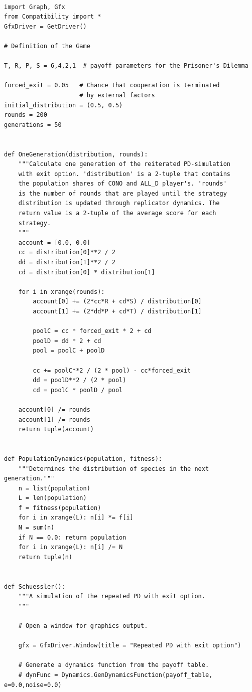 \begin{scriptsize}
\begin{verbatim}

import Graph, Gfx
from Compatibility import *
GfxDriver = GetDriver()

# Definition of the Game

T, R, P, S = 6,4,2,1  # payoff parameters for the Prisoner's Dilemma

forced_exit = 0.05   # Chance that cooperation is terminated 
                     # by external factors
initial_distribution = (0.5, 0.5)
rounds = 200
generations = 50


def OneGeneration(distribution, rounds):
    """Calculate one generation of the reiterated PD-simulation
    with exit option. 'distribution' is a 2-tuple that contains
    the population shares of CONO and ALL_D player's. 'rounds'
    is the number of rounds that are played until the strategy
    distribution is updated through replicator dynamics. The
    return value is a 2-tuple of the average score for each
    strategy.
    """
    account = [0.0, 0.0]
    cc = distribution[0]**2 / 2
    dd = distribution[1]**2 / 2
    cd = distribution[0] * distribution[1]
    
    for i in xrange(rounds):       
        account[0] += (2*cc*R + cd*S) / distribution[0]
        account[1] += (2*dd*P + cd*T) / distribution[1]

        poolC = cc * forced_exit * 2 + cd
        poolD = dd * 2 + cd
        pool = poolC + poolD
       
        cc += poolC**2 / (2 * pool) - cc*forced_exit
        dd = poolD**2 / (2 * pool)
        cd = poolC * poolD / pool
        
    account[0] /= rounds
    account[1] /= rounds
    return tuple(account)


def PopulationDynamics(population, fitness):
    """Determines the distribution of species in the next generation."""  
    n = list(population)
    L = len(population)
    f = fitness(population)
    for i in xrange(L): n[i] *= f[i]
    N = sum(n)
    if N == 0.0: return population
    for i in xrange(L): n[i] /= N
    return tuple(n)


def Schuessler():
    """A simulation of the repeated PD with exit option.
    """

    # Open a window for graphics output.
    
    gfx = GfxDriver.Window(title = "Repeated PD with exit option")

    # Generate a dynamics function from the payoff table.
    # dynFunc = Dynamics.GenDynamicsFunction(payoff_table, e=0.0,noise=0.0)


\end{verbatim}
\end{scriptsize}
